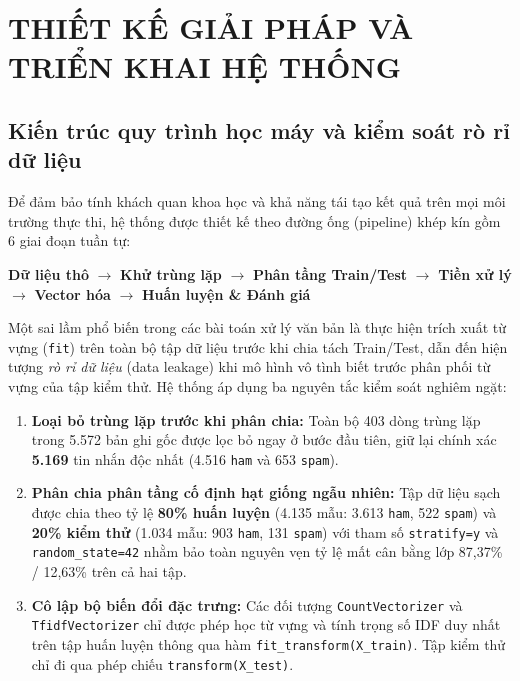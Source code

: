 \documentclass[12pt,a4paper]{report}
\begin{document}
\chapter{THIẾT KẾ GIẢI PHÁP VÀ TRIỂN KHAI HỆ THỐNG}

\section{Kiến trúc quy trình học máy và kiểm soát rò rỉ dữ liệu}
Để đảm bảo tính khách quan khoa học và khả năng tái tạo kết quả trên mọi môi trường thực thi, hệ thống được thiết kế theo đường ống (pipeline) khép kín gồm 6 giai đoạn tuần tự:
\begin{center}
    \textbf{Dữ liệu thô} $\rightarrow$ \textbf{Khử trùng lặp} $\rightarrow$ \textbf{Phân tầng Train/Test} $\rightarrow$ \textbf{Tiền xử lý} $\rightarrow$ \textbf{Vector hóa} $\rightarrow$ \textbf{Huấn luyện \& Đánh giá}
\end{center}

Một sai lầm phổ biến trong các bài toán xử lý văn bản là thực hiện trích xuất từ vựng (\texttt{fit}) trên toàn bộ tập dữ liệu trước khi chia tách Train/Test, dẫn đến hiện tượng \textit{rò rỉ dữ liệu} (data leakage) khi mô hình vô tình biết trước phân phối từ vựng của tập kiểm thử. Hệ thống áp dụng ba nguyên tắc kiểm soát nghiêm ngặt:
\begin{enumerate}
    \item \textbf{Loại bỏ trùng lặp trước khi phân chia:} Toàn bộ 403 dòng trùng lặp trong 5.572 bản ghi gốc được lọc bỏ ngay ở bước đầu tiên, giữ lại chính xác \textbf{5.169} tin nhắn độc nhất (4.516 \texttt{ham} và 653 \texttt{spam}).
    \item \textbf{Phân chia phân tầng cố định hạt giống ngẫu nhiên:} Tập dữ liệu sạch được chia theo tỷ lệ \textbf{80\% huấn luyện} (4.135 mẫu: 3.613 \texttt{ham}, 522 \texttt{spam}) và \textbf{20\% kiểm thử} (1.034 mẫu: 903 \texttt{ham}, 131 \texttt{spam}) với tham số \texttt{stratify=y} và \texttt{random\_state=42} nhằm bảo toàn nguyên vẹn tỷ lệ mất cân bằng lớp 87,37\% / 12,63\% trên cả hai tập.
    \item \textbf{Cô lập bộ biến đổi đặc trưng:} Các đối tượng \texttt{CountVectorizer} và \texttt{TfidfVectorizer} chỉ được phép học từ vựng và tính trọng số IDF duy nhất trên tập huấn luyện thông qua hàm \texttt{fit\_transform(X\_train)}. Tập kiểm thử chỉ đi qua phép chiếu \texttt{transform(X\_test)}.
\end{enumerate}
\end{document}
